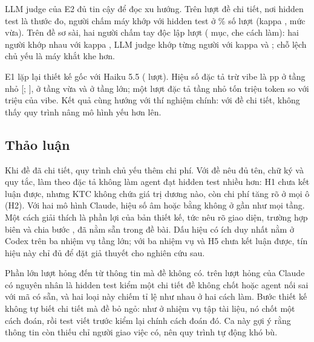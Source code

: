 \begin{table}[H]
\centering\footnotesize
\caption{E2: điểm checklist với đề sơ sài, đặc tả trừ vibe (pp, KTC 95\%); trong ngoặc: chỉ tham khảo
(dưới sáu nhiệm vụ); ``--'': không chạy}
\label{tab:e2-primary}

\end{table}

LLM judge của E2 đủ tin cậy để đọc xu hướng. Trên \NumETwoJudgeN{} lượt đề chi tiết, nơi hidden test là thước đo, người
chấm máy khớp với hidden test ở \NumETwoJudgeAgreePct{}\% số lượt (kappa \NumETwoJudgeKappa{}, mức vừa). Trên đề sơ
sài, hai người chấm tay độc lập \NumETwoHumanUnits{} lượt (\NumETwoHumanItems{} mục, che cách làm): hai người
khớp nhau với kappa \NumETwoHumanLoiBaoKappa{}, LLM judge khớp từng người với kappa
\NumETwoHumanLoiJudgeKappa{} và \NumETwoHumanBaoJudgeKappa{}; chỗ lệch chủ yếu là máy khắt khe hơn.

E1 lặp lại thiết kế gốc với Haiku 5.5 (\NumEOneRuns{} lượt). Hiệu số đặc tả trừ vibe là \NumEOneSmallDiffPp{} pp
ở tầng nhỏ [\NumEOneSmallLowPp{}; \NumEOneSmallHighPp{}], \NumEOneMediumDiffPp{} ở tầng vừa và
\NumEOneLargeDiffPp{} ở tầng lớn; một lượt đặc tả tầng nhỏ tốn \NumEOneSmallSpecTokensM{} triệu token so với
\NumEOneSmallVibeTokensM{} triệu của vibe. Kết quả cùng hướng với thí nghiệm chính: với đề chi tiết, không thấy quy
trình nâng mô hình yếu hơn lên.

\subsection{Thảo luận}\label{sec:discussion}

Khi đề đã chi tiết, quy trình chủ yếu thêm chi phí. Với đề nêu đủ tên, chữ ký và quy tắc, làm theo đặc
tả không làm agent đạt hidden test nhiều hơn: H1 chưa kết luận được, nhưng KTC không chứa giá trị dương nào, còn
chi phí tăng rõ ở mọi ô (H2). Với hai mô hình Claude, hiệu số âm hoặc bằng không ở gần như mọi tầng. Một cách giải
thích là phần lợi của bản thiết kế, tức nêu rõ giao diện, trường hợp biên và chia bước
\cite{zi_2025}, đã nằm sẵn trong đề bài. Dấu hiệu có ích duy nhất nằm ở Codex trên ba nhiệm vụ tầng lớn; với ba
nhiệm vụ và H5 chưa kết luận được, tín hiệu này chỉ đủ để đặt giả thuyết cho nghiên cứu sau.

Phần lớn lượt hỏng đến từ thông tin mà đề không có. \NumLabOutside{} trên \NumLabRuns{} lượt hỏng của
Claude có nguyên nhân là hidden test kiểm một chi tiết đề không chốt hoặc agent nối sai với mã có sẵn, và hai loại này chiếm tỉ lệ như nhau ở hai cách làm. Bước thiết kế không tự biết chi tiết mà đề bỏ ngỏ: như
ở nhiệm vụ tập tài liệu, nó chốt một cách đoán, rồi test viết trước kiểm lại chính cách đoán đó. Ca này gợi ý rằng thông
tin còn thiếu chỉ người giao việc có, nên quy trình tự động khó bù.


